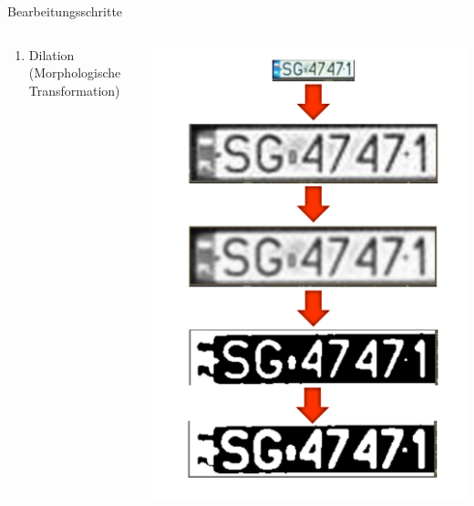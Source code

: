 \begin{frame}{Bearbeitungsschritte}
\begin{columns}
\begin{column}{0.6\textwidth}
\begin{enumerate}
                \item {\small Dilation (Morphologische Transformation)}
            \end{enumerate}
        \end{column}
        \begin{column}{0.40\textwidth}
            \begin{center}
                \includegraphics[width=\textwidth]{img/preprocessing}
            \end{center}
        \end{column}
    \end{columns}
\end{frame}

